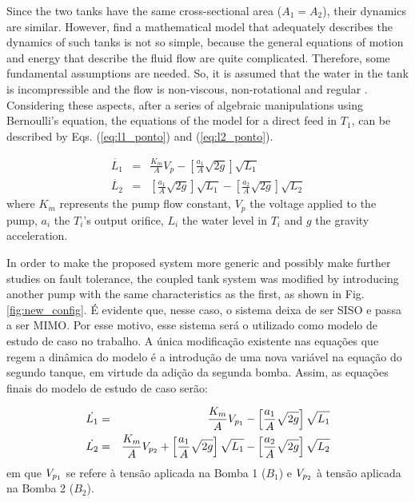 \documentclass[10pt,fleqn,a4paper]{article}
\begin{document}

Since the two tanks have the same cross-sectional area ($A_1 = A_2$), their
dynamics are similar. However, find a mathematical model that adequately
describes the dynamics of such tanks is not so simple, because the general
equations of motion and energy that describe the fluid flow are quite
complicated. Therefore, some fundamental assumptions are needed. So, it is
assumed that the water in the tank is incompressible and the flow is
non-viscous, non-rotational and regular \citep{dorf:2009}. Considering these
aspects, after a series of algebraic manipulations using Bernoulli's equation,
the equations of the model for a direct feed in $T_1$, can be described by Eqs.
(\ref{eq:l1_ponto}) and (\ref{eq:l2_ponto}).

\begin{eqnarray}
\dot{L_1} & = & \frac{K_m}{A}V_p -
                \left[\frac{a_1}{A}\sqrt{2g}\right]\sqrt{L_1}
                \label{eq:l1_ponto}\\
\dot{L_2} & = & \left[\frac{a_1}{A}\sqrt{2g}\right]\sqrt{L_1} -
                \left[\frac{a_2}{A}\sqrt{2g}\right]\sqrt{L_2}
                \label{eq:l2_ponto}
\end{eqnarray}
%
where $K_m$ represents the pump flow constant, $V_p$ the voltage applied to the
pump, $a_i$ the $T_i$'s output orifice, $L_i$ the water level in $T_i$ and $g$
the gravity acceleration.

In order to make the proposed system more generic and possibly make further
studies on fault tolerance, the coupled tank system was modified by introducing
another pump with the same characteristics as the first, as shown in Fig.
\ref{fig:new_config}.
É evidente que, nesse caso, o sistema deixa de ser SISO e passa a ser MIMO. Por
esse motivo, esse sistema será o utilizado como modelo de estudo de caso no
trabalho. A única modificação existente nas equações que regem a dinâmica do
modelo é a introdução de uma nova variável na equação do segundo tanque, em
virtude da adição da segunda bomba. Assim, as equações finais do modelo de
estudo de caso serão:

\begin{eqnarray}
\dot{L_1} & = & \frac{K_m}{A}V_{p_{\tiny 1}} -
                \left[\frac{a_1}{A}\sqrt{2g}\right]\sqrt{L_1}
                \label{eq:l1_ponto_fin}\\
\dot{L_2} & = & \frac{K_m}{A}V_{p_{\tiny 2}} +
                \left[\frac{a_1}{A}\sqrt{2g}\right]\sqrt{L_1} -
                \left[\frac{a_2}{A}\sqrt{2g}\right]\sqrt{L_2}
                \label{eq:l2_ponto_fin}
\end{eqnarray}
%
em que $V_{p_{\tiny 1}}$ se refere à tensão aplicada na Bomba 1 ($B_1$) e
$V_{p_{\tiny 2}}$ à tensão aplicada na Bomba 2 ($B_2$).
\end{document}
